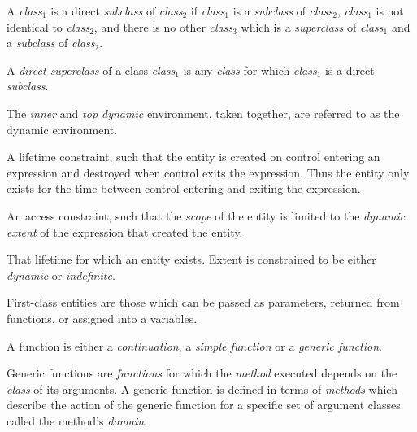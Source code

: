 \begin{optDefinition}
\begin{definitions}
     A {\em class$_1$} is a direct
    {\em subclass} of {\em class$_2$} if {\em class$_1$} is a {\em subclass} of
    {\em class$_2$}, {\em class$_1$} is not identical to {\em class$_2$}, and
    there is no other {\em class$_3$} which is a {\em superclass} of {\em
        class$_1$} and a {\em subclass} of {\em class$_2$}.

     
     A {\em direct superclass} of a class {\em
        class$_1$} is any {\em class} for which {\em class$_1$} is a direct {\em
        subclass}.

     The
    {\em inner} and {\em top dynamic} environment, taken together, are referred
    to as the dynamic environment.

     A lifetime
    constraint, such that the entity is created on control entering an
    expression and destroyed when control exits the expression.  Thus the entity
    only exists for the time between control entering and exiting the
    expression.

     An access
    constraint, such that the {\em scope} of the entity is limited to the {\em
        dynamic extent} of the expression that created the entity.

     That lifetime for which an entity
    exists.  Extent is constrained to be either {\em dynamic} or {\em
        indefinite}.

     First-class entities
    are those which can be passed as parameters, returned from functions, or
    assigned into a variables.

     A function is either a {\em
        continuation}, a {\em simple function} or a {\em generic function}.

      Generic
    functions are {\em functions} for which the {\em method} executed depends on
    the {\em class} of its arguments.  A generic function is defined in terms of
    {\em methods} which describe the action of the generic function for a
    specific set of argument classes called the method's {\em domain}.


\end{definitions}
\end{optDefinition}
